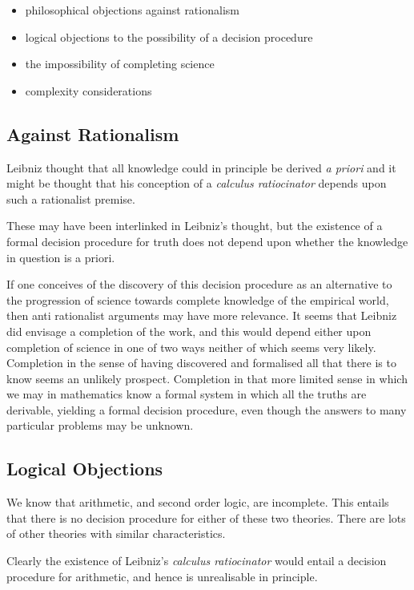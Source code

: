 \documentclass{rbjk}
\begin{document}
\begin{article}
\begin{itemize}
\item philosophical objections against rationalism
\item logical objections to the possibility of a decision procedure
\item the impossibility of completing science
\item complexity considerations
\end{itemize}

\subsection{Against Rationalism}

Leibniz thought that all knowledge could in principle be derived {\it a priori} and it might be thought that his conception of a {\it calculus ratiocinator} depends upon such a rationalist premise.

These may have been interlinked in Leibniz's thought, but the existence of a formal decision procedure for truth does not depend upon whether the knowledge in question is a priori.

If one conceives of the discovery of this decision procedure as an alternative to the progression of science towards complete knowledge of the empirical world, then anti rationalist arguments may have more relevance.
It seems that Leibniz did envisage a completion of the work, and this would depend either upon completion of science in one of two ways neither of which seems very likely.
Completion in the sense of having discovered and formalised all that there is to know seems an unlikely prospect.
Completion in that more limited sense in which we may in mathematics know a formal system in which all the truths are derivable, yielding a formal decision procedure, even though the answers to many particular problems may be unknown.

\subsection{Logical Objections}

We know that arithmetic, and second order logic, are incomplete.
This entails that there is no decision procedure for either of these two theories.
There are lots of other theories with similar characteristics.

Clearly the existence of Leibniz's {\it calculus ratiocinator} would entail a decision procedure for arithmetic, and hence is unrealisable in principle.


\end{article}
\end{document}
